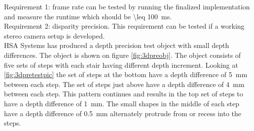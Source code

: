 Requirement 1: frame rate can be tested by running the finalized implementation and measure the runtime which should be \SI{\leq 100}{\milli\second}. \\

Requirement 2: disparity precision. This requirement can be tested if a working stereo camera setup is developed. \\
HSA Systems has produced a depth precision test object with small depth differences. The object is shown on figure \vref{fig:3dpreobj}. The object consists of five sets of steps with each stair having different depth increment. Looking at \vref{fig:3dpretestpic} the set of steps at the bottom have a depth difference of \SI{5}{\milli\meter} between each step. The set of steps just above have a depth difference of \SI{4}{\milli\meter} between each step. This pattern continues and results in the top set of steps to have a depth difference of \SI{1}{\milli\meter}. The small shapes in the middle of each step have a depth difference of \SI{0.5}{\milli\meter} alternately protrude from or recess into the steps.\\

